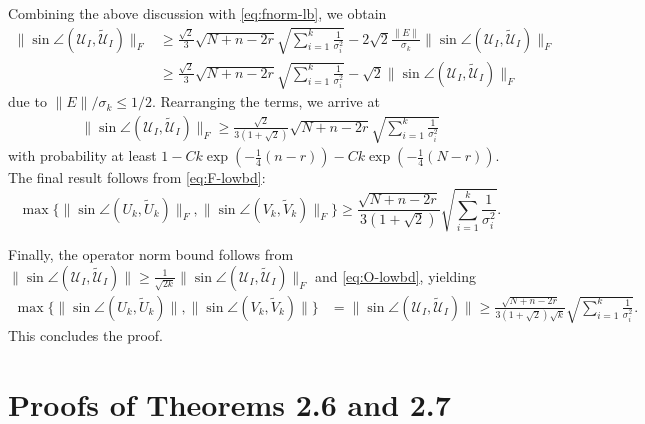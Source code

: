 \documentclass[reqno]{amsart}
\theoremstyle{plain}
\theoremstyle{definition}
\begin{document}
Combining the above discussion with \eqref{eq:fnorm-lb}, we obtain
\begin{align*}
\| \sin \angle (\mathcal U_{I}, \widetilde{\mathcal U}_{I}) \|_F &\ge \frac{\sqrt{2}}{3} \sqrt{N+n-2r} \sqrt{\sum_{i=1}^k \frac{1}{\sigma_i^2}} - 2\sqrt{2} \frac{\|E\|}{\sigma_k}\| \sin \angle (\mathcal U_{I}, \widetilde{\mathcal U}_{I}) \|_F\\
&\ge \frac{\sqrt{2}}{3} \sqrt{N+n-2r} \sqrt{\sum_{i=1}^k \frac{1}{\sigma_i^2}} - \sqrt{2} \| \sin \angle (\mathcal U_{I}, \widetilde{\mathcal U}_{I}) \|_F
\end{align*}
due to $\|E\|/\sigma_k \le 1/2$. Rearranging the terms, we arrive at 
\begin{align*}
\| \sin \angle (\mathcal U_{I}, \widetilde{\mathcal U}_{I}) \|_F  \ge \frac{\sqrt 2}{3(1+\sqrt 2)} \sqrt{N+n-2r} \sqrt{\sum_{i=1}^k \frac{1}{\sigma_i^2}}
\end{align*}
with probability at least $1-Ck\exp(-\frac{1}{4}(n-r))-Ck\exp(-\frac{1}{4}(N-r))$.
The final result follows from \eqref{eq:F-lowbd}:
$$\max\{ \|\sin \angle ( U_{k}, \widetilde{ U}_{k})\|_F, \|\sin \angle ( V_{k}, \widetilde{ V}_{k})\|_F\} \ge \frac{ \sqrt{N+n-2r}}{3(1+\sqrt 2)} \sqrt{\sum_{i=1}^k \frac{1}{\sigma_i^2}}.$$

Finally, the operator norm bound follows  from $\|\sin \angle (\mathcal U_{I}, \widetilde{\mathcal U}_{I})\| \ge \frac{1}{\sqrt{2k}} \|\sin \angle (\mathcal U_{I}, \widetilde{\mathcal U}_{I})\|_F$ and \eqref{eq:O-lowbd}, yielding
\begin{align*}
\max\{\|\sin \angle ( U_{k}, \widetilde{ U}_{k})\|, \|\sin \angle ( V_{k}, \widetilde{ V}_{k})\| \} &= \|\sin \angle (\mathcal U_{I}, \widetilde{\mathcal U}_{I})\| \ge\frac{ \sqrt{N+n-2r}}{3(1+\sqrt 2)\sqrt{k}} \sqrt{\sum_{i=1}^k \frac{1}{\sigma_i^2}}.
\end{align*}
This concludes the proof.


\section{Proofs of Theorems 2.6 and 2.7}\label{sec:general}
\end{document}
